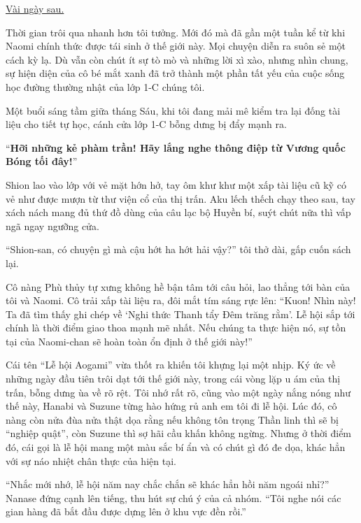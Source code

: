 \documentclass[../main.tex]{subfiles}
\begin{document}
\begin{center}
  \uline{Vài ngày sau.}
\end{center}

Thời gian trôi qua nhanh hơn tôi tưởng. Mới đó mà đã gần một tuần kể từ khi Naomi chính thức được tái sinh ở thế giới này. Mọi chuyện diễn ra suôn sẻ một cách kỳ lạ. Dù vẫn còn chút ít sự tò mò và những lời xì xào, nhưng nhìn chung, sự hiện diện của cô bé mắt xanh đã trở thành một phần tất yếu của cuộc sống học đường thường nhật của lớp 1-C chúng tôi.

Một buổi sáng tầm giữa tháng Sáu, khi tôi đang mải mê kiểm tra lại đống tài liệu cho tiết tự học, cánh cửa lớp 1-C bỗng dưng bị đẩy mạnh ra.

``\textbf{Hỡi những kẻ phàm trần! Hãy lắng nghe thông điệp từ Vương quốc Bóng tối đây!}''

Shion lao vào lớp với vẻ mặt hớn hở, tay ôm khư khư một xấp tài liệu cũ kỹ có vẻ như được mượn từ thư viện cổ của thị trấn. Aku lếch thếch chạy theo sau, tay xách nách mang đủ thứ đồ dùng của câu lạc bộ Huyền bí, suýt chút nữa thì vấp ngã ngay ngưỡng cửa.

``Shion-san, có chuyện gì mà cậu hớt ha hớt hải vậy?'' tôi thở dài, gấp cuốn sách lại.

Cô nàng Phù thủy tự xưng không hề bận tâm tới câu hỏi, lao thẳng tới bàn của tôi và Naomi. Cô trải xấp tài liệu ra, đôi mắt tím sáng rực lên: ``Kuon! Nhìn này! Ta đã tìm thấy ghi chép về `Nghi thức Thanh tẩy Đêm trăng rằm'. Lễ hội sắp tới chính là thời điểm giao thoa mạnh mẽ nhất. Nếu chúng ta thực hiện nó, sự tồn tại của Naomi-chan sẽ hoàn toàn ổn định ở thế giới này!''

Cái tên ``Lễ hội Aogami'' vừa thốt ra khiến tôi khựng lại một nhịp. Ký ức về những ngày đầu tiên trôi dạt tới thế giới này, trong cái vòng lặp u ám của thị trấn, bỗng dưng ùa về rõ rệt. Tôi nhớ rất rõ, cũng vào một ngày nắng nóng như thế này, Hanabi và Suzune từng hào hứng rủ anh em tôi đi lễ hội. Lúc đó, cô nàng còn nửa đùa nửa thật dọa rằng nếu không tôn trọng Thần linh thì sẽ bị ``nghiệp quật'', còn Suzune thì sợ hãi cầu khấn không ngừng. Nhưng ở thời điểm đó, cái gọi là lễ hội mang một màu sắc bí ẩn và có chút gì đó đe dọa, khác hẳn với sự náo nhiệt chân thực của hiện tại.

``Nhắc mới nhớ, lễ hội năm nay chắc chắn sẽ khác hẳn hồi năm ngoái nhỉ?'' Nanase đứng cạnh lên tiếng, thu hút sự chú ý của cả nhóm. ``Tôi nghe nói các gian hàng đã bắt đầu được dựng lên ở khu vực đền rồi.''
\end{document}
